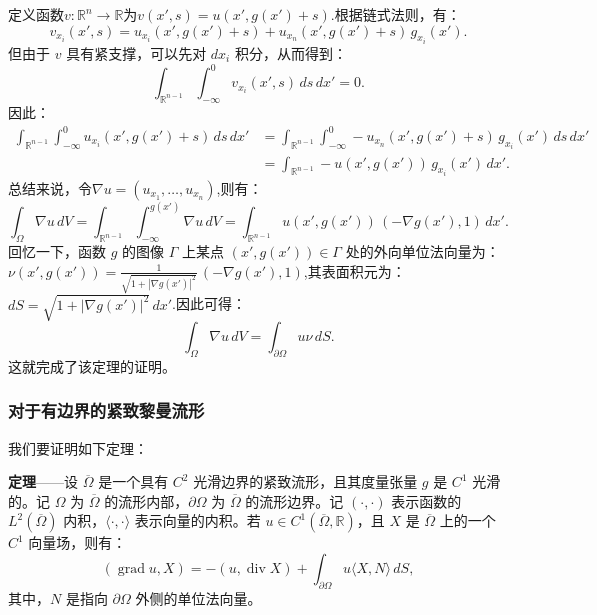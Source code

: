 \begin{enumerate}
$$$$
定义函数$v: \mathbb{R}^n \to \mathbb{R}$为$v(x', s) = u(x', g(x') + s)$.根据链式法则，有：
$$
v_{x_i}(x', s) = u_{x_i}(x', g(x') + s) + u_{x_n}(x', g(x') + s) \, g_{x_i}(x').~
$$
但由于 $v$ 具有紧支撑，可以先对 $dx_i$ 积分，从而得到：
$$
\int_{\mathbb{R}^{n-1}} \int_{-\infty}^{0} v_{x_i}(x', s) \, ds \, dx' = 0.~
$$
因此：
$$
\begin{aligned}
\int_{\mathbb{R}^{n-1}} \int_{-\infty}^{0} u_{x_i}(x', g(x') + s) \, ds \, dx'
&= \int_{\mathbb{R}^{n-1}} \int_{-\infty}^{0} -u_{x_n}(x', g(x') + s) \, g_{x_i}(x') \, ds \, dx' \\
&= \int_{\mathbb{R}^{n-1}} -u(x', g(x')) \, g_{x_i}(x') \, dx'.
\end{aligned}~
$$
总结来说，令$\nabla u = (u_{x_1}, \dots, u_{x_n})$,则有：
$$
\int_{\Omega} \nabla u \, dV = \int_{\mathbb{R}^{n-1}} \int_{-\infty}^{g(x')} \nabla u \, dV = \int_{\mathbb{R}^{n-1}} u(x', g(x')) \, (-\nabla g(x'), 1) \, dx'.~
$$
回忆一下，函数 $g$ 的图像 $\Gamma$ 上某点 $(x', g(x')) \in \Gamma$ 处的外向单位法向量为：$\nu(x', g(x')) = \frac{1}{\sqrt{1 + |\nabla g(x')|^2}} \, (-\nabla g(x'), 1)$,其表面积元为：$dS = \sqrt{1 + |\nabla g(x')|^2} \, dx'$.因此可得：
$$
\int_{\Omega} \nabla u \, dV = \int_{\partial \Omega} u \nu \, dS.~
$$
这就完成了该定理的证明。
\end{enumerate}
\subsubsection{对于有边界的紧致黎曼流形}
我们要证明如下定理：

\textbf{定理}——设 $\overline{\Omega}$ 是一个具有 $C^2$ 光滑边界的紧致流形，且其度量张量 $g$ 是 $C^1$ 光滑的。记 $\Omega$ 为 $\overline{\Omega}$ 的流形内部，$\partial \Omega$ 为 $\overline{\Omega}$ 的流形边界。记 $(\cdot,\cdot)$ 表示函数的 $L^2(\overline{\Omega})$ 内积，$\langle \cdot,\cdot \rangle$ 表示向量的内积。若 $u \in C^1(\overline{\Omega},\mathbb{R})$，且 $X$ 是 $\overline{\Omega}$ 上的一个 $C^1$ 向量场，则有：
$$
(\operatorname{grad} u, X) = -(u, \operatorname{div} X) + \int_{\partial \Omega} u \langle X, N \rangle \, dS,~
$$
其中，$N$ 是指向 $\partial \Omega$ 外侧的单位法向量。


